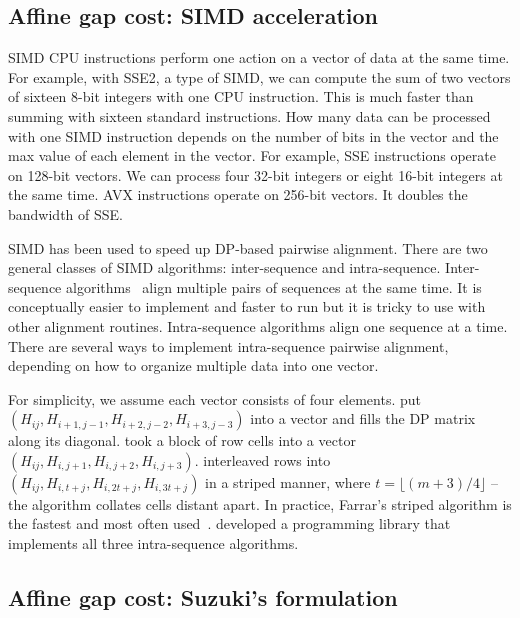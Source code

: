 \documentclass{bioinfo}
\begin{document}
\begin{methods}
\subsection{Affine gap cost: SIMD acceleration}

SIMD CPU instructions perform one action on a vector of data at the same time.
For example, with SSE2, a type of SIMD, we can compute the sum of two vectors
of sixteen 8-bit integers with one CPU instruction. This is much faster than
summing with sixteen standard instructions. How many data can be processed with
one SIMD instruction depends on the number of bits in the vector and the max
value of each element in the vector. For example, SSE instructions operate on
128-bit vectors. We can process four 32-bit integers or eight 16-bit integers
at the same time. AVX instructions operate on 256-bit vectors. It doubles the
bandwidth of SSE.

SIMD has been used to speed up DP-based pairwise alignment. There are two
general classes of SIMD algorithms: inter-sequence and intra-sequence.
Inter-sequence algorithms~\citep{Rognes:2011aa} align multiple pairs of
sequences at the same time. It is conceptually easier to implement and faster
to run but it is tricky to use with other alignment routines. Intra-sequence
algorithms align one sequence at a time. There are several ways to implement
intra-sequence pairwise alignment, depending on how to organize multiple data
into one vector.

For simplicity, we assume each vector consists of four elements.
\citet{Wozniak:1997aa} put $(H_{ij},H_{i+1,j-1},H_{i+2,j-2},H_{i+3,j-3})$
into a vector and fills the DP matrix along its diagonal.
\citet{Rognes:2000aa} took a block of row cells into a vector
$(H_{ij},H_{i,j+1},H_{i,j+2},H_{i,j+3})$. \citet{Farrar:2007hs} interleaved rows
into $(H_{ij},H_{i,t+j},H_{i,2t+j},H_{i,3t+j})$ in a striped manner, where
$t=\lfloor(m+3)/4\rfloor$ -- the algorithm collates cells distant apart. In
practice, Farrar's striped algorithm is the fastest and most often
used~\citep{Szalkowski:2008aa,Zhao:2013aa}. \citet{Daily:2016aa} developed a
programming library that implements all three intra-sequence algorithms.

\subsection{Affine gap cost: Suzuki's formulation}


\end{methods}
\end{document}
